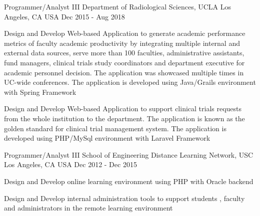 \begin{cventries}
  \cventry
    {Programmer/Analyst III} %
    {Department of Radiological Sciences, UCLA} %
    {Los Angeles, CA USA} %
    {Dec 2015 - Aug 2018} %
    {
      \begin{cvitems} %
        \item {Design and Develop Web-based Application to generate academic performance metrics  of faculty academic productivity by integrating multiple internal and external data sources, serve more than 100 faculties, administrative assistants, fund managers, clinical trials study coordinators and department executive for academic personnel decision. The application was showcased multiple times in UC-wide conferences. The application is developed using Java/Grails environment with Spring Framework}
        \item {Design and Develop Web-based Application to support clinical trials requests from the whole institution to the department. The application is known as the golden standard for clinical trial management system. The application is developed using PHP/MySql environment with Laravel Framework}       
      \end{cvitems}
    }
	
  \cventry
    {Programmer/Analyst III} %
    {School of Engineering Distance Learning Network, USC} %
    {Los Angeles, CA USA} %
    {Dec 2012 - Dec 2015} %
    {
      \begin{cvitems} %
        \item {Design and Develop online learning environment  using PHP with Oracle backend}
        \item {Design and Develop internal administration tools to support students , faculty and administrators  in the remote learning environment}       
      \end{cvitems}
    }


\end{cventries}
